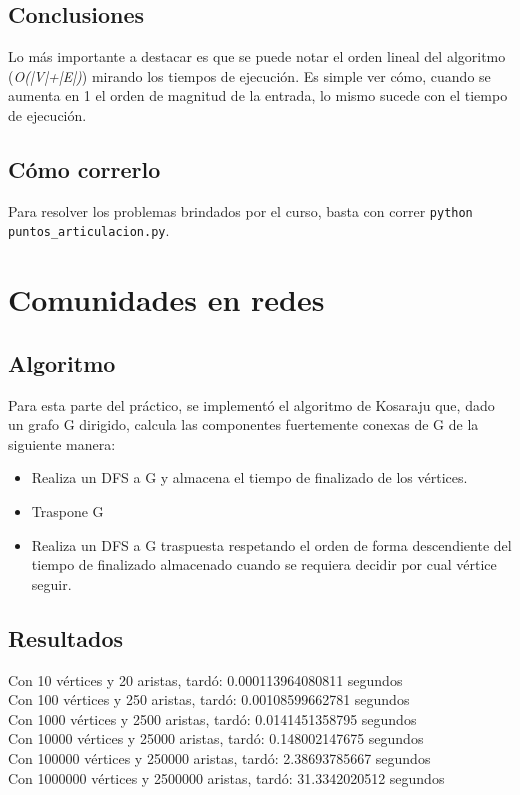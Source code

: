 \documentclass[a4paper,10pt]{article}
\begin{document}
\subsection{Conclusiones}
	Lo más importante a destacar es que se puede notar el orden lineal del algoritmo (\emph{O(|V|+|E|)}) mirando los tiempos de ejecución. Es simple ver cómo, cuando se aumenta en 1 el orden de magnitud de la entrada, lo mismo sucede con el tiempo de ejecución.
\subsection{Cómo correrlo}
	Para resolver los problemas brindados por el curso, basta con correr \texttt{python puntos\_articulacion.py}.

\section{Comunidades en redes}
\subsection{Algoritmo}
	Para esta parte del práctico, se implementó el algoritmo de Kosaraju que, dado un grafo G dirigido, calcula las componentes fuertemente conexas de G de la siguiente manera:
	\begin{itemize}
		\item Realiza un DFS a G y almacena el tiempo de finalizado de los vértices.
		\item Traspone G
		\item Realiza un DFS a G traspuesta respetando el orden de forma descendiente del tiempo de finalizado almacenado cuando se requiera decidir por cual vértice seguir.
	\end{itemize}
\subsection{Resultados}
	\noindent Con 10 vértices y 20 aristas, tardó: 0.000113964080811 segundos \\
	Con 100 vértices y 250 aristas, tardó: 0.00108599662781 segundos \\
	Con 1000 vértices y 2500 aristas, tardó: 0.0141451358795 segundos \\
	Con 10000 vértices y 25000 aristas, tardó: 0.148002147675 segundos \\
	Con 100000 vértices y 250000 aristas, tardó: 2.38693785667 segundos \\
	Con 1000000 vértices y 2500000 aristas, tardó: 31.3342020512 segundos
\end{document}
